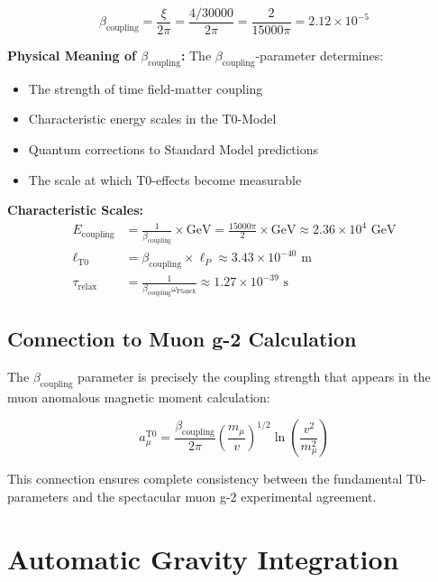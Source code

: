\documentclass[12pt,a4paper]{report}
\newcommand{\xipar}{\xi}      %
\begin{document}
\begin{equation}\label{eq:beta_coupling}
	\beta_{\text{coupling}} = \frac{\xipar}{2\pi} = \frac{4/30000}{2\pi} = \frac{2}{15000\pi} = 2.12 \times 10^{-5}
\end{equation}

\textbf{Physical Meaning of $\beta_{\text{coupling}}$:}
The $\beta_{\text{coupling}}$-parameter determines:
\begin{itemize}
	\item The strength of time field-matter coupling
	\item Characteristic energy scales in the T0-Model  
	\item Quantum corrections to Standard Model predictions
	\item The scale at which T0-effects become measurable
\end{itemize}

\textbf{Characteristic Scales:}
\begin{align}
	E_{\text{coupling}} &= \frac{1}{\beta_{\text{coupling}}} \times \text{GeV} = \frac{15000\pi}{2} \times \text{GeV} \approx 2.36 \times 10^{4} \text{ GeV} \\
	\ell_{\text{T0}} &= \beta_{\text{coupling}} \times \ell_P \approx 3.43 \times 10^{-40} \text{ m} \\
	\tau_{\text{relax}} &= \frac{1}{\beta_{\text{coupling}} \omega_{\text{Planck}}} \approx 1.27 \times 10^{-39} \text{ s}
\end{align}

\subsection{Connection to Muon g-2 Calculation}\label{subsec:connection_muon_g2}

The $\beta_{\text{coupling}}$ parameter is precisely the coupling strength that appears in the muon anomalous magnetic moment calculation:

\begin{equation}\label{eq:muon_g2_coupling}
	a_\mu^{\text{T0}} = \frac{\beta_{\text{coupling}}}{2\pi} \left(\frac{m_\mu}{v}\right)^{1/2} \ln\left(\frac{v^2}{m_\mu^2}\right)
\end{equation}

This connection ensures complete consistency between the fundamental T0-parameters and the spectacular muon g-2 experimental agreement.
\section{Automatic Gravity Integration}\label{sec:automatic_gravity}
\end{document}
